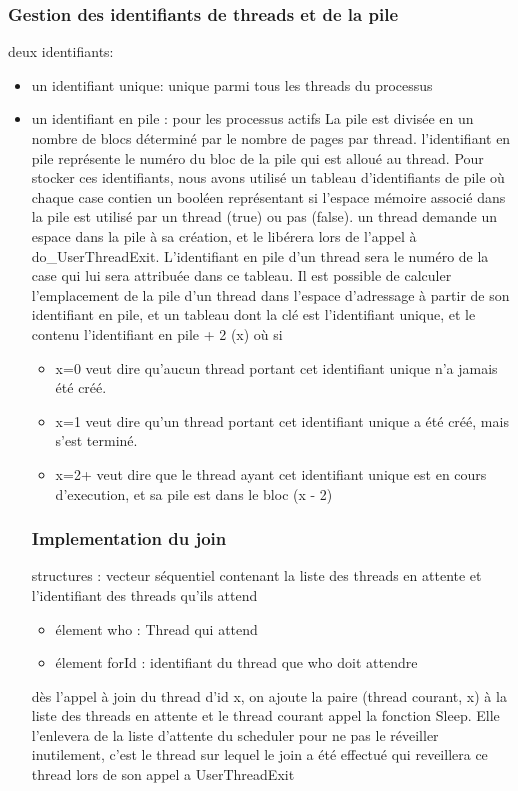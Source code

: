 \documentclass{article}
\begin{document}
		\subsubsection{Gestion des identifiants de threads et de la pile}
			deux identifiants:
			\begin{itemize}
				\item un identifiant unique: unique parmi tous les threads du processus
				\item un identifiant en pile : pour les processus actifs
				La pile est divisée en un nombre de blocs déterminé par le nombre de pages par thread. l'identifiant en pile représente le numéro du bloc de la pile qui est alloué au thread. Pour stocker ces identifiants, nous avons utilisé un tableau d'identifiants de pile où chaque case contien un booléen représentant si l'espace mémoire associé dans la pile est utilisé par un thread (true) ou pas (false). un thread demande un espace dans la pile à sa création, et le libérera lors de l'appel à do_UserThreadExit. L'identifiant en pile d'un thread sera le numéro de la case qui lui sera attribuée dans ce tableau. Il est possible de calculer l'emplacement de la pile d'un thread dans l'espace d'adressage à partir de son identifiant en pile, et un tableau dont la clé est l'identifiant unique, et le contenu l'identifiant en pile + 2 (x) où si
				\begin{itemize}
					\item x=0 veut dire qu'aucun thread portant cet identifiant unique n'a jamais été créé.
					\item x=1 veut dire qu'un thread portant cet identifiant unique a été créé, mais s'est terminé.
					\item x=2+ veut dire que le thread ayant cet identifiant unique est en cours d'execution, et sa pile est dans le bloc (x - 2)
				\end{itemize}
		\subsubsection{Implementation du join}
			structures : vecteur séquentiel contenant la liste des threads en attente et l'identifiant des threads qu'ils attend
				\begin{itemize}
					\item élement who : Thread qui attend
					\item élement forId : identifiant du thread que who doit attendre
				\end{itemize}
			dès l'appel à join du thread d'id x, on ajoute la paire (thread courant, x) à la liste des threads en attente et le thread courant appel la fonction Sleep. Elle l'enlevera de la liste d'attente du scheduler pour ne pas le réveiller inutilement, c'est le thread sur lequel le join a été effectué qui reveillera ce thread lors de son appel a UserThreadExit


\end{itemize}
\end{document}
